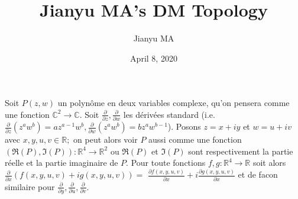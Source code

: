\documentclass[]{article}
\title{Jianyu MA's DM Topology}
\author{Jianyu MA}
\date{April 8, 2020}
\theoremstyle{remark}
\begin{document}
\maketitle

Soit $P(z, w)$ un polynôme en deux variables complexe, qu'on pensera comme une fonction $\mathbb{C}^{2} \rightarrow \mathbb{C}.$ Soit $ \frac{\partial}{\partial z}, \frac{\partial}{\partial w} $ les dérivées standard (i.e. $\frac{\partial}{\partial z}\left(z^{a} w^{b}\right)=a z^{a-1} w^{b}, \frac{\partial}{\partial w}\left(z^{a} w^{b}\right)=b z^{a} w^{b-1}$).
Posons $z=x+i y$ et $w=u+i v$ avec $x, y, u, v \in \mathbb{R} ;$ on peut alors voir $P$ aussi comme une fonction $(\Re(P), \Im(P)): \mathbb{R}^{4} \rightarrow \mathbb{R}^{2}$ ou $\Re(P)$ et $\Im(P)$ sont respectivement la partie réelle et la partie imaginaire de $P .$ Pour toute fonctions $f, g: \mathbb{R}^{4} \rightarrow \mathbb{R}$ soit alors $\frac{\partial}{\partial x}(f(x, y, u, v)+i g(x, y, u, v))=$ $\frac{\partial f(x, y, u, v)}{\partial x}+i \frac{\partial g(x, y, u, v)}{\partial x}$ et de facon similaire pour $\frac{\partial}{\partial y}, \frac{\partial}{\partial u}, \frac{\partial}{\partial v} .$
\end{document}
